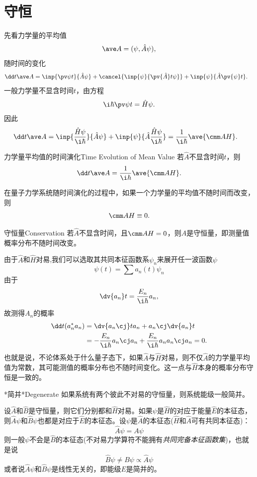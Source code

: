 \section{守恒}
先看力学量的平均值
\[
	\ave A=(\psi,\hat A\psi),
\]
随时间的变化
\begin{align*}
	\dd t{\ave A} & =\inp{\pv\psi{t}}{\hat A\psi}+\cancel{\inp{\psi}{\pv{\hat A}t\psi}}+\inp{\psi}{\hat A\pv{\psi}t}.
\end{align*}
一般力学量不显含时间$t$，由\Schr 方程
\[
	\i\hbar\pv\psi{t}=\hat H\psi.
\]
因此
\begin{align*}
	\dd t{\ave A} & =\inp{\frac{\hat H\psi}{\i\hbar}}{\hat A\psi}+\inp{\psi}{\hat A\frac{\hat H\psi}{\i\hbar}}
	=\frac1{\i\hbar}\ave{\cmm AH}. %
\end{align*}
\begin{theorem}{力学量平均值的时间演化}{Time Evolution of Mean Value}
	若$\hat A$不显含时间$t$，则
	\begin{align}
		\dd t\ave A=\frac1{\i\hbar}\ave{\cmm AH}.
	\end{align}
\end{theorem}
在量子力学系统随时间演化的过程中，如果一个力学量的平均值不随时间而改变，则
\[
	\cmm AH\equiv 0.
\]
\begin{theorem}{守恒量}{Conservation}
	若$\hat A$不显含时间，且$\cmm AH=0$，则$\hat A$是守恒量，即测量值概率分布不随时间改变。
\end{theorem}
由于$\hat A$和$\hat H$对易,我们可以选取其共同本征函数系$\psi_n$来展开任一波函数$\psi$
\[
	\psi(t)=\sum a_n(t)\psi_n
\]
由于
\[
	\dv{a_n}t=\frac{E_n}{\i\hbar}a_n,
\]
故测得$A_n$的概率
\begin{align*}
	\dd t(a_n^*a_n) & =\dv{a_n\cj}ta_n+a_n\cj\dv{a_n}t                                    \\
	                & =-\frac{E_n}{\i\hbar}a_n\cj a_n+\frac{E_n}{\i\hbar}a_na_n\cj a_n=0.
\end{align*}
也就是说，不论体系处于什么量子态下，如果$\hat A$与$\hat H$对易，则不仅$\hat A$的力学量平均值为常数，其可能测值的概率分布也不随时间变化。这一点与$\hat H$本身的概率分布守恒是一致的。

\begin{theorem}{*简并}{*Degenerate}
	如果系统有两个彼此不对易的守恒量，则系统能级一般简并。
\end{theorem}
设$\hat A$和$\hat B$是守恒量，则它们分别都和$\hat H$对易。如果$\psi$是$\hat H$的对应于能量$\hat E$的本征态，则$\hat A\psi$和$\hat B\psi$也都是对应于$\hat E$的本征态。设$\psi$是$\hat A$的本征态($\hat H$和$\hat A$可有共同本征态)：
\[
	\hat A\psi=A\psi
\]
则一般$\psi$不会是$\hat B$的本征态(不对易力学算符不能拥有\textit{共同完备本征函数集})，也就是说
\[
	\hat B\psi\neq B\psi\propto\hat A\psi
\]
或者说$\hat A\psi$和$\hat B\psi$是线性无关的，即能级$E$是简并的。

